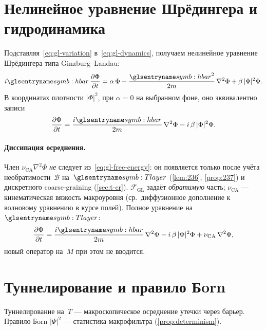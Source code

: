 \section{Нелинейное уравнение Шрёдингера и гидродинамика}
\label{sec:nlse-hydro}

Подставляя~\eqref{eq:gl-variation} в~\eqref{eq:gl-dynamics}, получаем нелинейное уравнение
Шрёдингера типа Ginzburg--Landau:
\begin{equation}
\label{eq:nlse-gl}
  i\planckHbar\,\frac{\partial\Phi}{\partial t}
  = \alpha\,\Phi
  - \frac{\planckHbar^2}{2m}\,\nabla^2\Phi
  + \beta\,|\Phi|^2\Phi.
\end{equation}
В координатах плотности $|\Phi|^2$, при $\alpha=0$ на выбранном фоне, оно эквивалентно записи
\begin{equation}
\label{eq:nlse-gl-real}
  \frac{\partial\Phi}{\partial t}
  = \frac{i\planckHbar}{2m}\,\nabla^2\Phi
  - i\,\beta\,|\Phi|^2\Phi.
\end{equation}

\paragraph{Диссипация осреднения.}
Член $\nu_{\mathrm{CA}}\nabla^2\Phi$ \emph{не} следует из~\eqref{eq:gl-free-energy}:
он появляется только после учёта необратимости~$\mathcal{B}$ на~$\Tlayer$
(\cref{lem:236}, \cref{prop:237}) и дискретного coarse-graining (\cref{sec:t-cr}).
$\mathcal{F}_{\mathrm{GL}}$ задаёт \emph{обратимую} часть; $\nu_{\mathrm{CA}}$ --- кинематическая вязкость
макроуровня (ср.~диффузионное дополнение к волновому уравнению в курсе полей).
Полное уравнение на~$\Tlayer$:
\[
  \frac{\partial\Phi}{\partial t}
  = \frac{i\planckHbar}{2m}\,\nabla^2\Phi
  - i\,\beta\,|\Phi|^2\Phi
  + \nu_{\mathrm{CA}}\,\nabla^2\Phi,
\]
новый оператор на~$M$ при этом не вводится.

\section{Туннелирование и правило Бorn}

Туннелирование на~$T$ --- макроскопическое осреднение утечки через барьер.
Правило Бorn $|\Psi|^2$ --- статистика макрофильтра (\cref{prop:determinism}).
